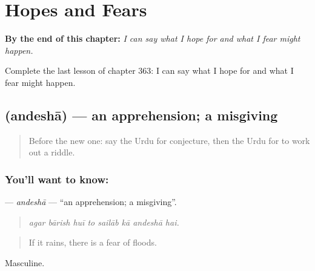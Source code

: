 
\chapter{Hopes and Fears}
\label{ch:ur-hopes-and-fears}

\begin{chapteropening}
\textbf{By the end of this chapter:} \emph{I can say what I hope for and what I fear might happen.}

Complete the last lesson of chapter 363: I can say what I hope for and what I fear might happen.
\end{chapteropening}

\section[\texorpdfstring{\ur{اندیشہ} (andeshā)}{اندیشہ (andeshā)}]{ (andeshā) — an apprehension; a misgiving}

\label{lesson:UR-C363-andesha}



\begin{quote}
Before the new one: say the Urdu for conjecture, then the Urdu for to work out a riddle.
\end{quote}

\subsection*{You'll want to know: }
\textbf{} — \emph{andeshā} — \textquotedblleft{}an apprehension; a misgiving\textquotedblright{}.

\begin{quote}
       
\end{quote}

\begin{quote}
\emph{agar bārish huī to sailāb kā andeshā hai.}
\end{quote}

\begin{quote}
If it rains, there is a fear of floods.
\end{quote}

Masculine.

